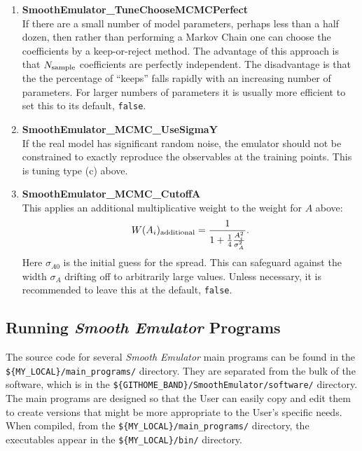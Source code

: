 \documentclass[UserManual.tex]{subfiles}
\begin{document}
\begin{enumerate}
\item {\bf SmoothEmulator\_TuneChooseMCMCPerfect}\\
If there are a small number of model parameters, perhaps less than a half dozen, then rather than performing a Markov Chain one can choose the coefficients by a keep-or-reject method. The advantage of this approach is that $N_{\rm sample}$ coefficients are perfectly independent. The disadvantage is that the the percentage of ``keeps'' falls rapidly with an increasing number of parameters. For larger numbers of parameters it is usually more efficient to set this to its default, {\tt false}. 

\item {\bf SmoothEmulator\_MCMC\_UseSigmaY}\\
If the real model has significant random noise, the emulator should not be constrained to exactly reproduce the observables at the training points. This is tuning type (c) above. 

\item {\bf SmoothEmulator\_MCMC\_CutoffA}\\
This applies an additional multiplicative weight to the weight for $A$ above:
\[
W(A_i)_{\rm additional}=\frac{1}{1+\frac{1}{4}\frac{A_i^2}{\sigma_{A}^2}}.
\] 
Here $\sigma_{A0}$ is the initial guess for the spread. This can safeguard against the width $\sigma_A$ drifting off to arbitrarily large values. Unless necessary, it is recommended to leave this at the default, {\tt false}.

\end{enumerate}

\subsection{Running {\it Smooth Emulator} Programs}

The source code for several {\it Smooth Emulator} main programs can be found in the \\{\tt \$\{MY\_LOCAL\}/main\_programs/} directory. They are separated from the bulk of the software, which is in the {\tt \$\{GITHOME\_BAND\}/SmoothEmulator/software/} directory. The main programs are designed so that the User can easily copy and edit them to create versions that might be more appropriate to the User's specific needs. When compiled, from the {\tt \$\{MY\_LOCAL\}/main\_programs/} directory, the executables appear in the {\tt \$\{MY\_LOCAL\}/bin/} directory. 
\end{document}
